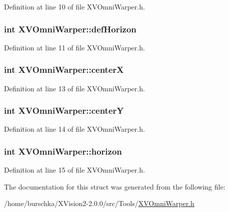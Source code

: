 Definition at line 10 of file XVOmni\-Warper.h.\label{XVOmniWarper_p2}
\hypertarget{class_XVOmniWarper_p2}{
\subsubsection[defHorizon]{\setlength{\rightskip}{0pt plus 5cm}int XVOmni\-Warper::def\-Horizon}}




Definition at line 11 of file XVOmni\-Warper.h.\label{XVOmniWarper_m0}
\hypertarget{class_XVOmniWarper_m0}{
\subsubsection[centerX]{\setlength{\rightskip}{0pt plus 5cm}int XVOmni\-Warper::center\-X}}




Definition at line 13 of file XVOmni\-Warper.h.\label{XVOmniWarper_m1}
\hypertarget{class_XVOmniWarper_m1}{
\subsubsection[centerY]{\setlength{\rightskip}{0pt plus 5cm}int XVOmni\-Warper::center\-Y}}




Definition at line 14 of file XVOmni\-Warper.h.\label{XVOmniWarper_m2}
\hypertarget{class_XVOmniWarper_m2}{
\subsubsection[horizon]{\setlength{\rightskip}{0pt plus 5cm}int XVOmni\-Warper::horizon}}




Definition at line 15 of file XVOmni\-Warper.h.

The documentation for this struct was generated from the following file:\begin{CompactItemize}
\item 
/home/burschka/XVision2-2.0.0/src/Tools/\hyperlink{XVOmniWarper.h-source}{XVOmni\-Warper.h}\end{CompactItemize}
